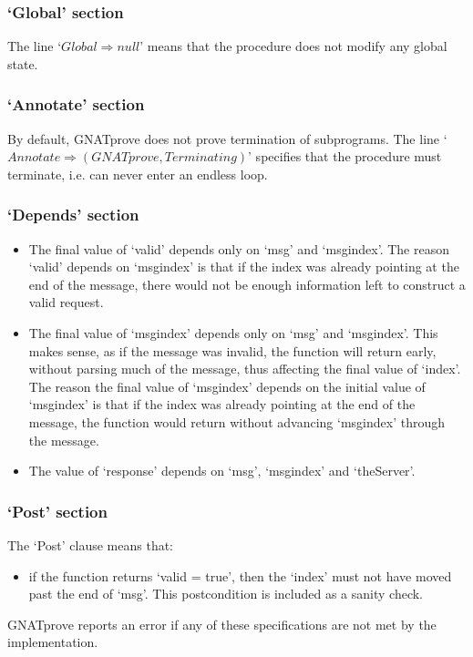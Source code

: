 \documentclass[12pt,openany,a4paper]{book}
\begin{document}
\subsubsection{`Global' section}
The line `$Global \Rightarrow null$' means that the procedure does not modify any global state.
\subsubsection{`Annotate' section}
By default, GNATprove does not prove termination of subprograms. The line `$Annotate \Rightarrow (GNATprove, Terminating)$' specifies that the procedure must terminate, i.e. can never enter an endless loop. 
\subsubsection{`Depends' section}
\begin{itemize}
\item The final value of `valid' depends only on `msg' and `msgindex'. The reason `valid' depends on `msgindex' is that if the index was already pointing at the end of the message, there would not be enough information left to construct a valid request.
\item The final value of `msgindex' depends only on `msg' and `msgindex'. This makes sense, as if the message was invalid, the function will return early, without parsing much of the message, thus affecting the final value of `index'. The reason the final value of `msgindex' depends on the initial value of `msgindex' is that if the index was already pointing at the end of the message, the function would return without advancing `msgindex' through the message.
\item The value of `response' depends on `msg', `msgindex' and `theServer'. 
\end{itemize}
\subsubsection{`Post' section}
The `Post' clause means that:
\begin{itemize}
\item if the function returns `valid = true', then the `index' must not have moved past the end of `msg'. This postcondition is included as a sanity check. 
\end{itemize}

GNATprove reports an error if any of these specifications are not met by the implementation.\\
\end{document}

